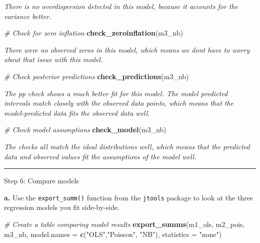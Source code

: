 \documentclass[
]{article}
\newenvironment{Shaded}{\begin{snugshade}}{\end{snugshade}}
\newcommand{\AttributeTok}[1]{\textcolor[rgb]{0.13,0.29,0.53}{#1}}
\newcommand{\CommentTok}[1]{\textcolor[rgb]{0.56,0.35,0.01}{\textit{#1}}}
\newcommand{\FunctionTok}[1]{\textcolor[rgb]{0.13,0.29,0.53}{\textbf{#1}}}
\newcommand{\NormalTok}[1]{#1}
\newcommand{\StringTok}[1]{\textcolor[rgb]{0.31,0.60,0.02}{#1}}
\begin{document}
\emph{There is no overdispersion detected in this model, because it
accounts for the variance better.}

\begin{Shaded}
\begin{Highlighting}[]
\CommentTok{\# Check for zero inflation}
\FunctionTok{check\_zeroinflation}\NormalTok{(m3\_nb)}
\end{Highlighting}
\end{Shaded}

\emph{There were no observed zeros in this model, which means we dont
have to worry about that issue with this model.}

\begin{Shaded}
\begin{Highlighting}[]
\CommentTok{\# Check posterior predictions}
\FunctionTok{check\_predictions}\NormalTok{(m3\_nb)}
\end{Highlighting}
\end{Shaded}

\emph{The pp check shows a much better fit for this model. The model
predicted intervals match closely with the observed data points, which
means that the model-predicted data fits the observed data well.}

\begin{Shaded}
\begin{Highlighting}[]
\CommentTok{\# Check model assumptions}
\FunctionTok{check\_model}\NormalTok{(m3\_nb)}
\end{Highlighting}
\end{Shaded}

\emph{The checks all match the ideal distributions well, which means
that the predicted data and observed values fit the assumptions of the
model well.}

\begin{center}\rule{0.5\linewidth}{0.5pt}\end{center}

Step 6: Compare models

\textbf{a.} Use the \texttt{export\_summ()} function from the
\texttt{jtools} package to look at the three regression models you fit
side-by-side.

\begin{Shaded}
\begin{Highlighting}[]
\CommentTok{\# Create a table comparing model results}
\FunctionTok{export\_summs}\NormalTok{(m1\_ols, m2\_pois, m3\_nb,}
             \AttributeTok{model.names =} \FunctionTok{c}\NormalTok{(}\StringTok{"OLS"}\NormalTok{,}\StringTok{"Poisson"}\NormalTok{, }\StringTok{"NB"}\NormalTok{),}
             \AttributeTok{statistics =} \StringTok{"none"}\NormalTok{)}
\end{Highlighting}
\end{Shaded}
\end{document}
